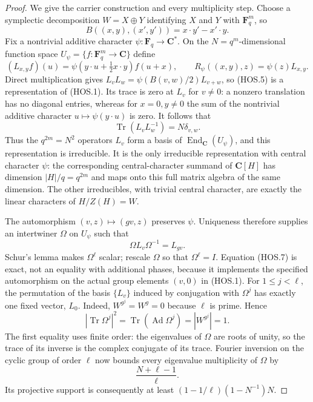 \begin{proof}
We give the carrier construction and every multiplicity step.
Choose a symplectic decomposition $W=X\oplus Y$ identifying
$X$ and $Y$ with $\mathbf F_q^m$, so
\[
 B((x,y),(x',y'))=x\cdot y'-x'\cdot y.
\]
Fix a nontrivial additive character $\psi:\mathbf F_q\to\mathbf C^*$.
On the $N=q^m$-dimensional function space
$U_\psi=\{f:\mathbf F_q^m\to\mathbf C\}$ define
\[
 (L_{x,y}f)(u)
   =\psi(y\cdot u+\tfrac12 x\cdot y)f(u+x),\qquad
 R_\psi((x,y),z)=\psi(z)L_{x,y}.
                                                               \tag{HOS.5}
\]
Direct multiplication gives
$L_vL_w=\psi(B(v,w)/2)L_{v+w}$, so (HOS.5) is a
representation of (HOS.1). Its trace is zero at $L_v$ for
$v\ne0$: a nonzero translation has no diagonal entries,
whereas for $x=0,y\ne0$ the sum of the nontrivial additive
character $u\mapsto\psi(y\cdot u)$ is zero.
It follows that
\[
        \operatorname{Tr}(L_vL_w^{-1})=N\delta_{v,w}.
                                                               \tag{HOS.6}
\]
Thus the $q^{2m}=N^2$ operators $L_v$ form a basis of
$\operatorname{End}_{\mathbf C}(U_\psi)$, and this
representation is irreducible. It is the only irreducible
representation with central character $\psi$: the corresponding
central-character summand of $\mathbf C[H]$ has dimension
$|H|/q=q^{2m}$ and maps onto this full matrix algebra of
the same dimension. The other irreducibles, with trivial
central character, are exactly the linear characters of
$H/Z(H)=W$.

The automorphism $(v,z)\mapsto(gv,z)$ preserves $\psi$.
Uniqueness therefore supplies an intertwiner $\Omega$ on
$U_\psi$ such that
\[
                  \Omega L_v\Omega^{-1}=L_{gv}.
                                                               \tag{HOS.7}
\]
Schur's lemma makes $\Omega^\ell$ scalar; rescale $\Omega$
so that $\Omega^\ell=I$. Equation (HOS.7) is exact, not
an equality with additional phases, because it implements
the specified automorphism on the actual group elements
$(v,0)$ in (HOS.1).
For $1\le j<\ell$, the permutation of the basis
$\{L_v\}$ induced by conjugation with $\Omega^j$ has
exactly one fixed vector, $L_0$. Indeed, $W^{g^j}=W^g=0$
because $\ell$ is prime. Hence
\[
 |\operatorname{Tr}\Omega^j|^2
  =\operatorname{Tr}(\operatorname{Ad}\Omega^j)
  =|W^{g^j}|=1.
                                                               \tag{HOS.8}
\]
The first equality uses finite order: the eigenvalues of
$\Omega$ are roots of unity, so the trace of its inverse
is the complex conjugate of its trace. Fourier inversion
on the cyclic group of order $\ell$ now bounds every
eigenvalue multiplicity of $\Omega$ by
\[
                  \frac{N+\ell-1}{\ell}.
                                                               \tag{HOS.9}
\]
Its projective support is consequently at least
$(1-1/\ell)(1-N^{-1})N$.


\end{proof}
